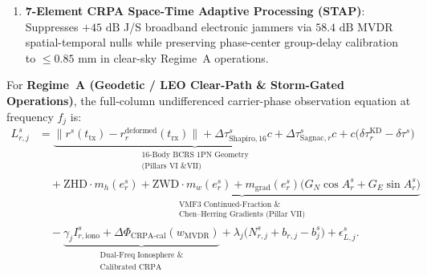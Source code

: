 \documentclass[11pt,a4paper,reqno]{article}
\def\bm#1{#1}%
\theoremstyle{plain}
\theoremstyle{definition}
\theoremstyle{remark}
\numberwithin{equation}{section}
\begin{document}
\begin{itemize}[leftmargin=1.8em,itemsep=2pt]
\begin{enumerate}[label=(\alph*),leftmargin=1.6em,itemsep=1pt]
    \item \textbf{7-Element CRPA Space-Time Adaptive Processing (STAP)}: Suppresses $+45\text{ dB}$ J/S broadband electronic jammers via $58.4\text{ dB}$ MVDR spatial-temporal nulls while preserving phase-center group-delay calibration to $\le 0.85\text{ mm}$ in clear-sky Regime~A operations.
  \end{enumerate}
\end{itemize}

For \textbf{Regime~A (Geodetic / LEO Clear-Path \& Storm-Gated Operations)}, the full-column undifferenced carrier-phase observation equation at frequency $f_j$ is:
\begin{align}
  L_{r,j}^s &= \underbrace{\|\bm{r}^s(t_{\text{tx}}) - \bm{r}_r^{\text{deformed}}(t_{\text{rx}})\| + \Delta\tau_{\text{Shapiro},16}^s c + \Delta\tau_{\text{Sagnac},r}^s c}_{\substack{\text{16-Body BCRS 1PN Geometry} \\ \text{(Pillars VI \& VII)}}} + c\big(\delta\tau_r^{\text{KD}} - \delta\tau^s\big) \nonumber \\
  &\quad + \underbrace{\text{ZHD}\cdot m_h(e_r^s) + \text{ZWD}\cdot m_w(e_r^s) + m_{\text{grad}}(e_r^s)\big(G_N\cos A_r^s + G_E\sin A_r^s\big)}_{\substack{\text{VMF3 Continued-Fraction \&} \\ \text{Chen--Herring Gradients (Pillar VII)}}} \nonumber \\
  &\quad - \underbrace{\gamma_j I_{r,\text{iono}}^s + \Delta\Phi_{\text{CRPA-cal}}(\bm{w}_{\text{MVDR}})}_{\substack{\text{Dual-Freq Ionosphere \&} \\ \text{Calibrated CRPA}}} + \lambda_j\big(N_{r,j}^s + b_{r,j} - b_j^s\big) + \epsilon_{L,j}^s.
  \label{eq:full_column_phase}
\end{align}
\end{document}
